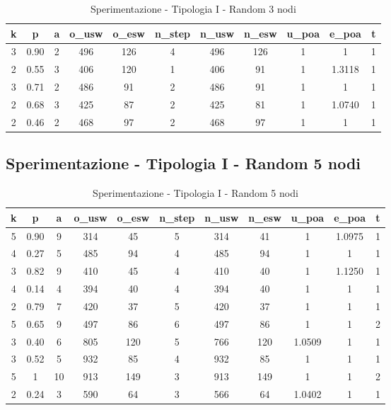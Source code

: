 \begin{table}[H]
\centering
\scalebox{0.9} {
\begin{tabular}{|c|c|c|c|c|c|c|c|c|c|c|}
\hline
\textbf{k} & \textbf{p} & \textbf{a} & \textbf{o\_usw} & \textbf{o\_esw} & \textbf{n\_step} & \textbf{n\_usw} & \textbf{n\_esw} & \textbf{u\_poa} & \textbf{e\_poa} & \textbf{t} \\ \hline
3 & 0.90 & 2 & 496 & 126 & 4 & 496 & 126 & 1 & 1 & 1 \\ \hline
2 & 0.55 & 3 & 406 & 120 & 1 & 406 & 91 & 1 & 1.3118 & 1 \\ \hline
3 & 0.71 & 2 & 486 & 91 & 2 & 486 & 91 & 1 & 1 & 1 \\ \hline
2 & 0.68 & 3 & 425 & 87 & 2 & 425 & 81 & 1 & 1.0740 & 1 \\ \hline
2 & 0.46 & 2 & 468 & 97 & 2 & 468 & 97 & 1 & 1 & 1 \\ \hline
\end{tabular}
}
\caption{Sperimentazione - Tipologia I - Random 3 nodi}
\label{tab:sperimentazione-tipo1-3nodi}
\end{table}


\subsection{Sperimentazione - Tipologia I - Random 5 nodi}

\begin{table}[H]
\centering
\scalebox{0.9} {
\begin{tabular}{|c|c|c|c|c|c|c|c|c|c|c|}
\hline
\textbf{k} & \textbf{p} & \textbf{a} & \textbf{o\_usw} & \textbf{o\_esw} & \textbf{n\_step} & \textbf{n\_usw} & \textbf{n\_esw} & \textbf{u\_poa} & \textbf{e\_poa} & \textbf{t} \\ \hline
5 & 0.90 & 9 & 314 & 45 & 5 & 314 & 41 & 1 & 1.0975 & 1 \\ \hline
4 & 0.27 & 5 & 485 & 94 & 4 & 485 & 94 & 1 & 1 & 1 \\ \hline
3 & 0.82 & 9 & 410 & 45 & 4 & 410 & 40 & 1 & 1.1250 & 1 \\ \hline
4 & 0.14 & 4 & 394 & 40 & 4 & 394 & 40 & 1 & 1 & 1 \\ \hline
2 & 0.79 & 7 & 420 & 37 & 5 & 420 & 37 & 1 & 1 & 1 \\ \hline
5 & 0.65 & 9 & 497 & 86 & 6 & 497 & 86 & 1 & 1 & 2 \\ \hline
3 & 0.40 & 6 & 805 & 120 & 5 & 766 & 120 & 1.0509 & 1 & 1 \\ \hline
3 & 0.52 & 5 & 932 & 85 & 4 & 932 & 85 & 1 & 1 & 1 \\ \hline
5 & 1 & 10 & 913 & 149 & 3 & 913 & 149 & 1 & 1 & 2 \\ \hline
2 & 0.24 & 3 & 590 & 64 & 3 & 566 & 64 & 1.0402 & 1 & 1 \\ \hline
\end{tabular}
}
\caption{Sperimentazione - Tipologia I - Random 5 nodi}
\label{tab:sperimentazione-tipo1-5nodi}
\end{table}


